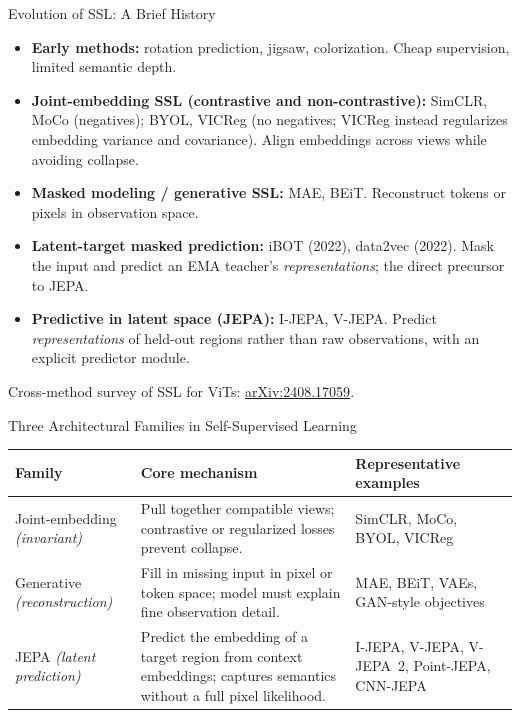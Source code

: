 \begin{frame}{Evolution of SSL: A Brief History}
  \begin{itemize}\itemsep0.28em
    \item \textbf{Early methods:} rotation prediction, jigsaw, colorization. Cheap supervision, limited semantic depth.
    \item \textbf{Joint-embedding SSL (contrastive and non-contrastive):} SimCLR, MoCo (negatives); BYOL, VICReg (no negatives; VICReg instead regularizes embedding variance and covariance). Align embeddings across views while avoiding collapse.
    \item \textbf{Masked modeling / generative SSL:} MAE, BEiT. Reconstruct tokens or pixels in observation space.
    \item \textbf{Latent-target masked prediction:} iBOT (2022), data2vec (2022). Mask the input and predict an EMA teacher's \emph{representations}; the direct precursor to JEPA.
    \item \textbf{Predictive in latent space (JEPA):} I-JEPA, V-JEPA. Predict \emph{representations} of held-out regions rather than raw observations, with an explicit predictor module.
  \end{itemize}
  \vspace{0.35em}
  {\scriptsize Cross-method survey of SSL for ViTs: \href{https://arxiv.org/abs/2408.17059}{arXiv:2408.17059}.}
\end{frame}

\begin{frame}{Three Architectural Families in Self-Supervised Learning}
  \footnotesize
  \begin{center}
    \renewcommand{\arraystretch}{1.25}
    \begin{tabular}{@{}p{2.35cm}p{4.35cm}p{3.55cm}@{}}
      \hline
      \textbf{Family} & \textbf{Core mechanism} & \textbf{Representative examples} \\
      \hline
      Joint-embedding \newline \textit{(invariant)} & Pull together compatible views; contrastive or regularized losses prevent collapse. & SimCLR, MoCo, BYOL, VICReg \\
      \hline
      Generative \newline \textit{(reconstruction)} & Fill in missing input in pixel or token space; model must explain fine observation detail. & MAE, BEiT, VAEs, GAN-style objectives \\
      \hline
      JEPA \newline \textit{(latent prediction)} & Predict the embedding of a target region from context embeddings; captures semantics without a full pixel likelihood. & I-JEPA, V-JEPA, V-JEPA~2, Point-JEPA, CNN-JEPA \\
      \hline
    \end{tabular}
  \end{center}
\end{frame}
